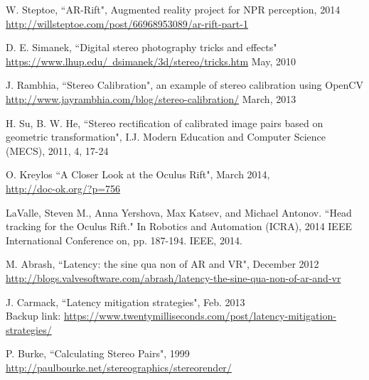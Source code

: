 \begin{thebibliography}{99}
W. Steptoe,
``AR-Rift", Augmented reality project for NPR perception, 2014 \\ \href{http://willsteptoe.com/post/66968953089/ar-rift-part-1}{http://willsteptoe.com/post/66968953089/ar-rift-part-1}

D. E. Simanek,
``Digital stereo photography tricks and effects" \\ \href{https://www.lhup.edu/~dsimanek/3d/stereo/tricks.htm}{https://www.lhup.edu/~dsimanek/3d/stereo/tricks.htm}
May, 2010

J. Rambhia,
``Stereo Calibration", an example of stereo calibration using OpenCV \\ \href{http://www.jayrambhia.com/blog/stereo-calibration/}{http://www.jayrambhia.com/blog/stereo-calibration/}
March, 2013

H. Su, B. W. He,
``Stereo rectification of calibrated image pairs based on geometric transformation",
I.J. Modern Education and Computer Science (MECS), 2011, 4, 17-24

O. Kreylos
``A Closer Look at the Oculus Rift", March 2014, \\ \href{http://doc-ok.org/?p=756}{http://doc-ok.org/?p=756}

LaValle, Steven M., Anna Yershova, Max Katsev, and Michael Antonov. ``Head tracking for the Oculus Rift." In Robotics and Automation (ICRA), 2014 IEEE International Conference on, pp. 187-194. IEEE, 2014.

M. Abrash,
``Latency: the sine qua non of AR and VR", December 2012 \\ \href{http://blogs.valvesoftware.com/abrash/latency-the-sine-qua-non-of-ar-and-vr}{http://blogs.valvesoftware.com/abrash/latency-the-sine-qua-non-of-ar-and-vr}

J. Carmack, ``Latency mitigation strategies", Feb. 2013 \\ Backup link: \href{https://www.twentymilliseconds.com/post/latency-mitigation-strategies/}{https://www.twentymilliseconds.com/post/latency-mitigation-strategies/}






P. Burke,
``Calculating Stereo Pairs", 1999 \\ \href{http://paulbourke.net/stereographics/stereorender/}{http://paulbourke.net/stereographics/stereorender/}


\end{thebibliography}
